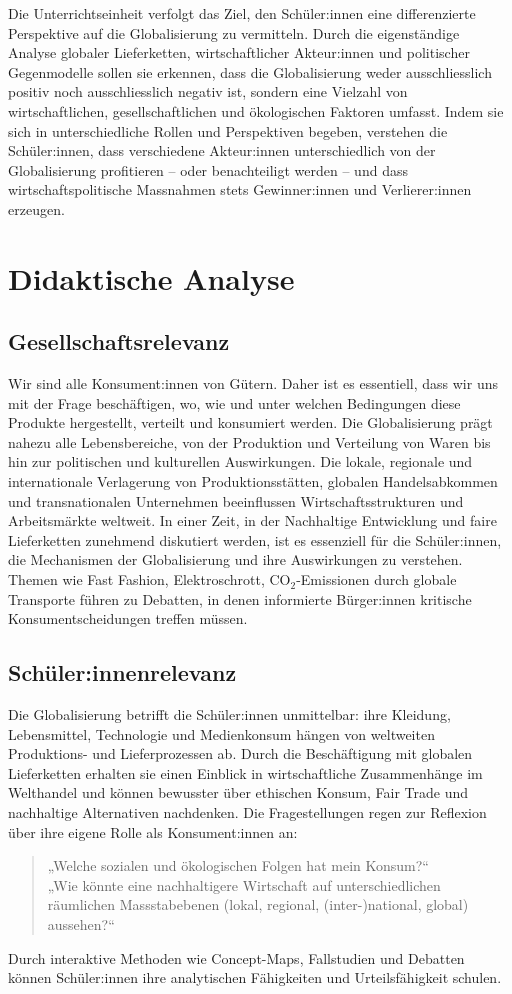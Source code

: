 Die Unterrichtseinheit verfolgt das Ziel, den Schüler:innen eine differenzierte Perspektive auf die Globalisierung zu vermitteln. Durch die eigenständige Analyse globaler Lieferketten, wirtschaftlicher Akteur:innen und politischer Gegenmodelle sollen sie erkennen, dass die Globalisierung weder ausschliesslich positiv noch ausschliesslich negativ ist, sondern eine Vielzahl von wirtschaftlichen, gesellschaftlichen und ökologischen Faktoren umfasst. Indem sie sich in unterschiedliche Rollen und Perspektiven begeben, verstehen die Schüler:innen, dass verschiedene Akteur:innen unterschiedlich von der Globalisierung profitieren -- oder benachteiligt werden -- und dass wirtschaftspolitische Massnahmen stets Gewinner:innen und Verlierer:innen erzeugen.

\section{Didaktische Analyse}
\subsection{Gesellschaftsrelevanz}
Wir sind alle Konsument:innen von Gütern. Daher ist es essentiell, dass wir uns mit der Frage beschäftigen, wo, wie und unter welchen Bedingungen diese Produkte hergestellt, verteilt und konsumiert werden. Die Globalisierung prägt nahezu alle Lebensbereiche, von der Produktion und Verteilung von Waren bis hin zur politischen und kulturellen Auswirkungen. Die lokale, regionale und internationale Verlagerung von Produktionsstätten, globalen Handelsabkommen und transnationalen Unternehmen beeinflussen Wirtschaftsstrukturen und Arbeitsmärkte weltweit. In einer Zeit, in der Nachhaltige Entwicklung und faire Lieferketten zunehmend diskutiert werden, ist es essenziell für die Schüler:innen, die Mechanismen der Globalisierung und ihre Auswirkungen zu verstehen. Themen wie Fast Fashion, Elektroschrott, CO$_2$-Emissionen durch globale Transporte führen zu Debatten, in denen informierte Bürger:innen kritische Konsumentscheidungen treffen müssen.

\subsection{Schüler:innenrelevanz}
Die Globalisierung betrifft die Schüler:innen unmittelbar: ihre Kleidung, Lebensmittel, Technologie und Medienkonsum hängen von weltweiten Produktions- und Lieferprozessen ab. Durch die Beschäftigung mit globalen Lieferketten erhalten sie einen Einblick in wirtschaftliche Zusammenhänge im Welthandel und können bewusster über ethischen Konsum, Fair Trade und nachhaltige Alternativen nachdenken. Die Fragestellungen regen zur Reflexion über ihre eigene Rolle als Konsument:innen an:
\begin{quote}
„Welche sozialen und ökologischen Folgen hat mein Konsum?“\\
„Wie könnte eine nachhaltigere Wirtschaft auf unterschiedlichen räumlichen Massstabebenen (lokal, regional, (inter-)national, global) aussehen?“
\end{quote}
Durch interaktive Methoden wie Concept-Maps, Fallstudien und Debatten können Schüler:innen ihre analytischen Fähigkeiten und Urteilsfähigkeit schulen.

